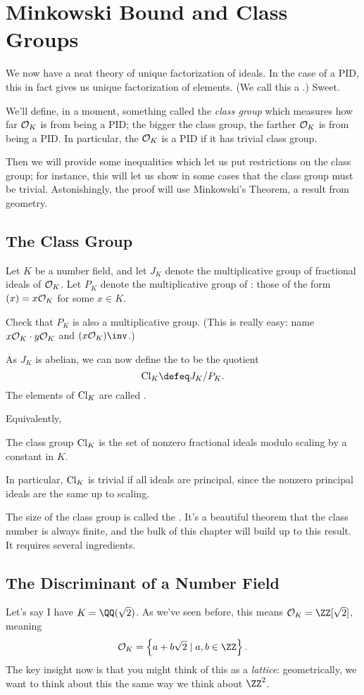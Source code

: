 \chapter{Minkowski Bound and Class Groups}
We now have a neat theory of unique factorization of ideals.
In the case of a PID, this in fact gives us unique factorization of elements.
(We call this a .)
Sweet.

We'll define, in a moment, something called the \emph{class group}
which measures how far $\mathcal O_K$ is from being a PID;
the bigger the class group, the farther $\mathcal O_K$ is from being a PID.
In particular, the $\mathcal O_K$ is a PID if it has trivial class group.

Then we will provide some inequalities which let us put restrictions on the class group;
for instance, this will let us show in some cases that the class group must be trivial.
Astonishingly, the proof will use Minkowski's Theorem, a result from geometry.

\section{The Class Group}
Let $K$ be a number field, and let $J_K$ denote the multiplicative group of fractional ideals of $\mathcal O_K$.
Let $P_K$ denote the multiplicative group of :
those of the form $(x) = x \mathcal O_K$ for some $x \in K$.
\begin{ques}
Check that $P_K$ is also a multiplicative group.
(This is really easy: name $x\mathcal O_K \cdot y\mathcal O_K$ and $(x\OO_K)\inv$.)
\end{ques}
As $J_K$ is abelian, we can now define the  to be the quotient
\[ \Cl_K \defeq J_K / P_K. \]
The elements of $\mathrm{Cl}_K$ are called .

Equivalently,
\begin{moral}
The class group $\mathrm{Cl}_K$ is the set of nonzero fractional ideals modulo
scaling by a constant in $K$.
\end{moral}
In particular, $\mathrm{Cl}_K$ is trivial if all ideals are principal,
since the nonzero principal ideals are the same up to scaling.

The size of the class group is called the .
It's a beautiful theorem that the class number is always finite,
and the bulk of this chapter will build up to this result.
It requires several ingredients.


\section{The Discriminant of a Number Field}
Let's say I have $K = \QQ(\sqrt 2)$.
As we've seen before, this means $\OO_K = \ZZ[\sqrt 2]$, meaning
\[ \OO_K = \left\{ a + b \sqrt 2 \mid a,b \in \ZZ \right\}. \]
The key insight now is that you might think of this as a \emph{lattice}:
geometrically, we want to think about this the same way we think about $\ZZ^2$.

